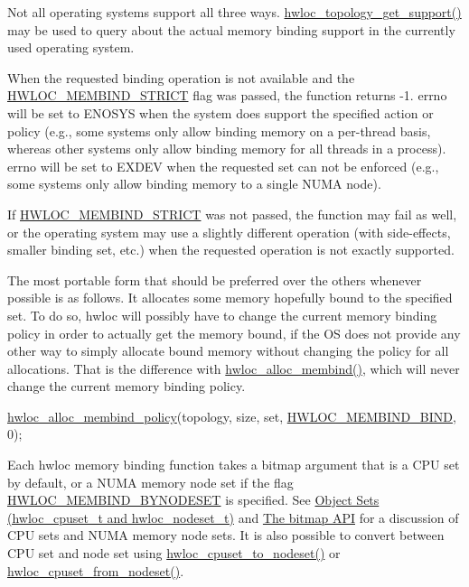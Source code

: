 Not all operating systems support all three ways. \hyperlink{a00193_gab8c76173c4a8ce1a9a9366012b1388e6}{hwloc\+\_\+topology\+\_\+get\+\_\+support()} may be used to query about the actual memory binding support in the currently used operating system.

When the requested binding operation is not available and the \hyperlink{a00191_ggab00475fd98815bf4fb9aaf752030e7d2a0335311a0ee04166df2888d52b4a42c6}{H\+W\+L\+O\+C\+\_\+\+M\+E\+M\+B\+I\+N\+D\+\_\+\+S\+T\+R\+I\+CT} flag was passed, the function returns -\/1. {\ttfamily errno} will be set to {\ttfamily E\+N\+O\+S\+YS} when the system does support the specified action or policy (e.\+g., some systems only allow binding memory on a per-\/thread basis, whereas other systems only allow binding memory for all threads in a process). {\ttfamily errno} will be set to E\+X\+D\+EV when the requested set can not be enforced (e.\+g., some systems only allow binding memory to a single N\+U\+MA node).

If \hyperlink{a00191_ggab00475fd98815bf4fb9aaf752030e7d2a0335311a0ee04166df2888d52b4a42c6}{H\+W\+L\+O\+C\+\_\+\+M\+E\+M\+B\+I\+N\+D\+\_\+\+S\+T\+R\+I\+CT} was not passed, the function may fail as well, or the operating system may use a slightly different operation (with side-\/effects, smaller binding set, etc.) when the requested operation is not exactly supported.

The most portable form that should be preferred over the others whenever possible is as follows. It allocates some memory hopefully bound to the specified set. To do so, hwloc will possibly have to change the current memory binding policy in order to actually get the memory bound, if the OS does not provide any other way to simply allocate bound memory without changing the policy for all allocations. That is the difference with \hyperlink{a00191_ga04736461780fadcf193af218c0122273}{hwloc\+\_\+alloc\+\_\+membind()}, which will never change the current memory binding policy.


\begin{DoxyCode}
\hyperlink{a00191_gab1b77b8408bacaf03c7e8878f7577922}{hwloc\_alloc\_membind\_policy}(topology, size, \textcolor{keyword}{set},
                           \hyperlink{a00191_ggac9764f79505775d06407b40f5e4661e8ad811fa4b2a6002c4d63695a408ffde2c}{HWLOC\_MEMBIND\_BIND}, 0);
\end{DoxyCode}


Each hwloc memory binding function takes a bitmap argument that is a C\+PU set by default, or a N\+U\+MA memory node set if the flag \hyperlink{a00191_ggab00475fd98815bf4fb9aaf752030e7d2a71f19fe4505f1c083dc8e6f7bdea6256}{H\+W\+L\+O\+C\+\_\+\+M\+E\+M\+B\+I\+N\+D\+\_\+\+B\+Y\+N\+O\+D\+E\+S\+ET} is specified. See \hyperlink{a00183}{Object Sets (hwloc\+\_\+cpuset\+\_\+t and hwloc\+\_\+nodeset\+\_\+t)} and \hyperlink{a00205}{The bitmap A\+PI} for a discussion of C\+PU sets and N\+U\+MA memory node sets. It is also possible to convert between C\+PU set and node set using \hyperlink{a00203_ga185751c1653fedbeb7cc480840f38cde}{hwloc\+\_\+cpuset\+\_\+to\+\_\+nodeset()} or \hyperlink{a00203_gad5ee8691e08a3538ea7633344c00456d}{hwloc\+\_\+cpuset\+\_\+from\+\_\+nodeset()}.

